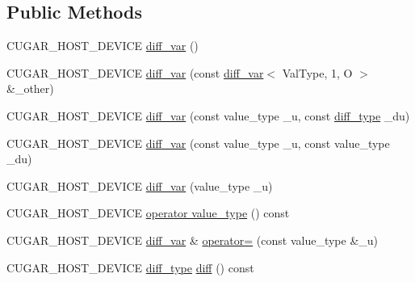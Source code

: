 \subsection*{Public Methods}
\begin{DoxyCompactItemize}
\item 
C\+U\+G\+A\+R\+\_\+\+H\+O\+S\+T\+\_\+\+D\+E\+V\+I\+CE \hyperlink{structcugar_1_1diff__var_3_01_val_type_00_011_00_01_o_01_4_a799727aaab5d85e36951155b4ab8515b}{diff\+\_\+var} ()
\item 
C\+U\+G\+A\+R\+\_\+\+H\+O\+S\+T\+\_\+\+D\+E\+V\+I\+CE \hyperlink{structcugar_1_1diff__var_3_01_val_type_00_011_00_01_o_01_4_a58a63aab6c19919f07a112ce9cad3632}{diff\+\_\+var} (const \hyperlink{structcugar_1_1diff__var}{diff\+\_\+var}$<$ Val\+Type, 1, O $>$ \&\+\_\+other)
\item 
C\+U\+G\+A\+R\+\_\+\+H\+O\+S\+T\+\_\+\+D\+E\+V\+I\+CE \hyperlink{structcugar_1_1diff__var_3_01_val_type_00_011_00_01_o_01_4_ad37c8d9800fc1e62dfa7d7b418796a17}{diff\+\_\+var} (const value\+\_\+type \+\_\+u, const \hyperlink{structcugar_1_1diff__var}{diff\+\_\+type} \+\_\+du)
\item 
C\+U\+G\+A\+R\+\_\+\+H\+O\+S\+T\+\_\+\+D\+E\+V\+I\+CE \hyperlink{structcugar_1_1diff__var_3_01_val_type_00_011_00_01_o_01_4_ad7a4bedc15a924ae8be08d752ace0342}{diff\+\_\+var} (const value\+\_\+type \+\_\+u, const value\+\_\+type \+\_\+du)
\item 
C\+U\+G\+A\+R\+\_\+\+H\+O\+S\+T\+\_\+\+D\+E\+V\+I\+CE \hyperlink{structcugar_1_1diff__var_3_01_val_type_00_011_00_01_o_01_4_abcf3e098a5477d53743b715bd8cb4931}{diff\+\_\+var} (value\+\_\+type \+\_\+u)
\item 
C\+U\+G\+A\+R\+\_\+\+H\+O\+S\+T\+\_\+\+D\+E\+V\+I\+CE \hyperlink{structcugar_1_1diff__var_3_01_val_type_00_011_00_01_o_01_4_ace7b3845ff1b58f06b30e05dee3e83f5}{operator value\+\_\+type} () const
\item 
C\+U\+G\+A\+R\+\_\+\+H\+O\+S\+T\+\_\+\+D\+E\+V\+I\+CE \hyperlink{structcugar_1_1diff__var}{diff\+\_\+var} \& \hyperlink{structcugar_1_1diff__var_3_01_val_type_00_011_00_01_o_01_4_a287e871a6b4be78523301a7586b8db45}{operator=} (const value\+\_\+type \&\+\_\+u)
\item 
C\+U\+G\+A\+R\+\_\+\+H\+O\+S\+T\+\_\+\+D\+E\+V\+I\+CE \hyperlink{structcugar_1_1diff__var}{diff\+\_\+type} \hyperlink{structcugar_1_1diff__var_3_01_val_type_00_011_00_01_o_01_4_a03a0aa61224d68fc8c5ec3d3e57944f8}{diff} () const
\item 
\mbox{\label{structcugar_1_1diff__var_3_01_val_type_00_011_00_01_o_01_4_a6aca30348981d4c007f61dbbe6751656}} 

\end{DoxyCompactItemize}
